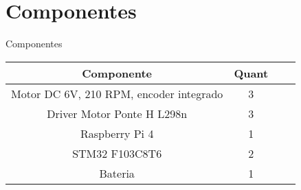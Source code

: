 
\section{Componentes}



\begin{quadro}[htb]
\caption{\label{lista de componentes}Componentes}
 \begin{tabular}{|c|c|c|c|}
	\hline
	\textbf{Componente} & \textbf{Quant} \\ \hline
	Motor DC 6V,  210 RPM, encoder integrado & 3  \\ \hline
	Driver Motor Ponte H L298n  & 3  \\ \hline
	Raspberry Pi 4    & 1   \\ \hline
	STM32 F103C8T6 & 2     \\ \hline
	Bateria & 1     \\ \hline
\end{tabular}
\end{quadro}


